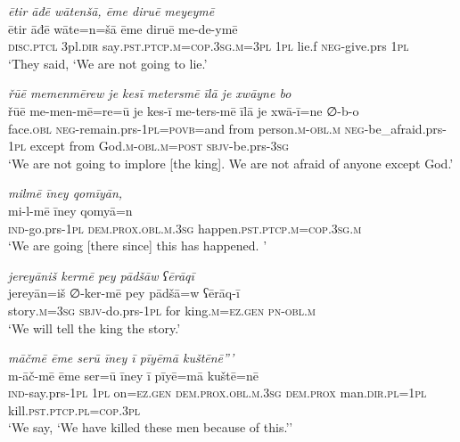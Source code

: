 \ea \label{BP.117}
\textit{ētir āđē wātenšā, ēme diruē meyeymē} \\ 
\gll ētir āđē wāte=n=šā ēme diruē me-de-ymē \\ 
 \textsc{disc.ptcl} 3pl\textsc{.dir} say\textsc{.pst}\textsc{.ptcp}\textsc{.m}\textsc{=cop}\textsc{.3sg}\textsc{.m}\textsc{=3pl} \textsc{1pl} lie.f \textsc{neg-}give.prs \textsc{1pl} \\ 
\glt `They said, ‘We are not going to lie.'
\z 
 
\ea \label{BP.118}
\textit{řūē memenmērew je kesī metersmē īlā je xwāyne bo} \\ 
\gll řūē me-men-mē=re=ū je kes-ī me-ters-mē īlā je xwā-ī=ne ∅-b-o \\ 
 face\textsc{.obl} \textsc{neg-}remain.prs\textsc{-\textsc{1pl}}\textsc{=\textsc{povb}}=and from person\textsc{.m}\textsc{-obl}\textsc{.m} \textsc{neg-}be\_afraid.prs\textsc{-\textsc{1pl}} except from God\textsc{.m}\textsc{-obl}\textsc{.m}\textsc{=\textsc{post}} \textsc{sbjv-}be.prs\textsc{-3sg} \\ 
\glt `We are not going to implore [the king]. We are not afraid of anyone except God.'
\z 
 
\ea \label{BP.119}
\textit{milmē īney qomīyān,} \\ 
\gll mi-l-mē īney qomyā=n \\ 
 \textsc{ind-}go.prs\textsc{-\textsc{1pl}} \textsc{dem.prox}\textsc{.obl}\textsc{.m}\textsc{.3sg} happen\textsc{.pst}\textsc{.ptcp}\textsc{.m}\textsc{=cop}\textsc{.3sg}\textsc{.m} \\ 
\glt `We are going [there since] this has happened. '
\z 
 
\ea \label{BP.120}
\textit{jereyāniš kermē pey pādšāw ʕērāqī} \\ 
\gll jereyān=iš ∅-ker-mē pey pādšā=w ʕērāq-ī \\ 
 story\textsc{.m}\textsc{=3sg} \textsc{sbjv-}do.prs\textsc{-\textsc{1pl}} for king\textsc{.m}\textsc{=ez.gen} \textsc{pn}\textsc{-obl}\textsc{.m} \\ 
\glt `We will tell the king the story.'
\z 
 
\ea \label{BP.121}
\textit{māčmē ēme serū īney ī pīyēmā kuštēnē”’} \\ 
\gll m-āč-mē ēme ser=ū īney ī pīyē=mā kuštē=nē \\ 
 \textsc{ind-}say.prs\textsc{-\textsc{1pl}} \textsc{1pl} on\textsc{=ez.gen} \textsc{dem.prox}\textsc{.obl}\textsc{.m}\textsc{.3sg} \textsc{dem.prox} man\textsc{.dir}\textsc{.pl}\textsc{=\textsc{1pl}} kill\textsc{.pst}\textsc{.ptcp}\textsc{.pl}\textsc{=cop}\textsc{.3pl} \\ 
\glt `We say, ‘We have killed these men because of this.’'
\z 
 
